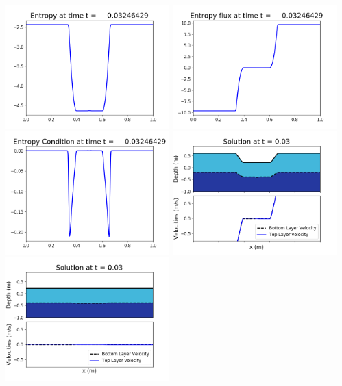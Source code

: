 \documentclass[11pt]{article}
\begin{document}
\vskip 10pt 
\includegraphics[width=0.475\textwidth]{frame0090fig1007.png}
\includegraphics[width=0.475\textwidth]{frame0090fig1008.png}
\vskip 10pt 
\includegraphics[width=0.475\textwidth]{frame0090fig1009.png}
\vskip 10pt 
\includegraphics[width=0.475\textwidth]{frame0091fig1001.png}
\includegraphics[width=0.475\textwidth]{frame0091fig1002.png}
\end{document}
